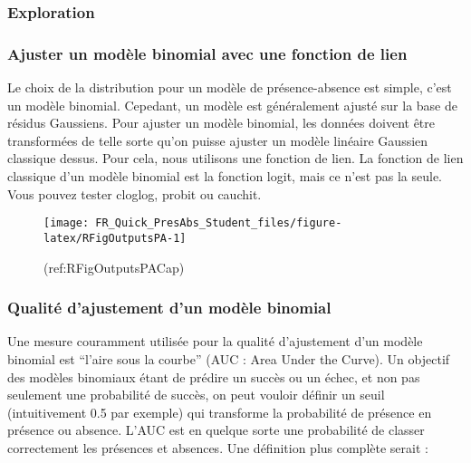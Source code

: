 \documentclass[french,a4paper]{article}
\begin{document}
\hypertarget{exploration}{%
\subsubsection{Exploration}\label{exploration}}

\hypertarget{ajuster-un-modele-binomial-avec-une-fonction-de-lien}{%
\subsubsection{Ajuster un modèle binomial avec une fonction de
lien}\label{ajuster-un-modele-binomial-avec-une-fonction-de-lien}}

Le choix de la distribution pour un modèle de présence-absence est
simple, c'est un modèle binomial. Cepedant, un modèle est généralement
ajusté sur la base de résidus Gaussiens. Pour ajuster un modèle
binomial, les données doivent être transformées de telle sorte qu'on
puisse ajuster un modèle linéaire Gaussien classique dessus. Pour cela,
nous utilisons une fonction de lien. La fonction de lien classique d'un
modèle binomial est la fonction logit, mais ce n'est pas la seule. Vous
pouvez tester cloglog, probit ou cauchit.

\begin{figure}[!h]

{\centering \texttt{[image: FR\_Quick\_PresAbs\_Student\_files/figure-latex/RFigOutputsPA-1]} 

}

\caption{(ref:RFigOutputsPACap)}\label{fig:RFigOutputsPA}
\end{figure}

\hypertarget{qualite-dajustement-dun-modele-binomial}{%
\subsubsection{Qualité d'ajustement d'un modèle
binomial}\label{qualite-dajustement-dun-modele-binomial}}

Une mesure couramment utilisée pour la qualité d'ajustement d'un modèle
binomial est ``l'aire sous la courbe'' (AUC : Area Under the Curve). Un
objectif des modèles binomiaux étant de prédire un succès ou un échec,
et non pas seulement une probabilité de succès, on peut vouloir définir
un seuil (intuitivement 0.5 par exemple) qui transforme la probabilité
de présence en présence ou absence. L'AUC est en quelque sorte une
probabilité de classer correctement les présences et absences. Une
définition plus complète serait :
\end{document}

